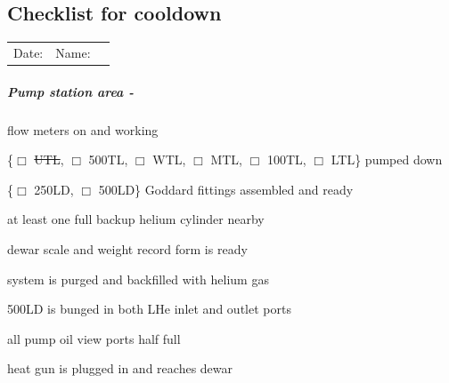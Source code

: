 \begin{appendices}
\noappendicestocpagenum
\addappheadtotoc
\chapter{Checklist for cooldown}
\label{appendix:checklist-for-cooldown}


\begin{tabular}{ l r c }
  Date: \underline{\hspace{4cm}} & Name: \underline{\hspace{4cm}}
\end{tabular}

\begin{minipage}{\textwidth}
\paragraph{Pump station area - \hef}
\begin{checklist}
 \item flow meters on and working
 \item \{$\Box$ \sout{UTL}, $\Box$ 500TL, $\Box$ WTL, $\Box$ MTL, $\Box$ 100TL, $\Box$ LTL\} pumped down
 \item \{$\Box$ 250LD, $\Box$ 500LD\} Goddard fittings assembled and ready
 \item at least one full backup helium cylinder nearby
 \item dewar scale and weight record form is ready
 \item system is purged and backfilled with helium gas
 \item 500LD is bunged in both LHe inlet and outlet ports
 \item all pump oil view ports half full
 \item heat gun is plugged in and reaches dewar
\end{checklist}
\end{minipage}

\begin{minipage}{\textwidth}

\end{minipage}
\end{appendices}
